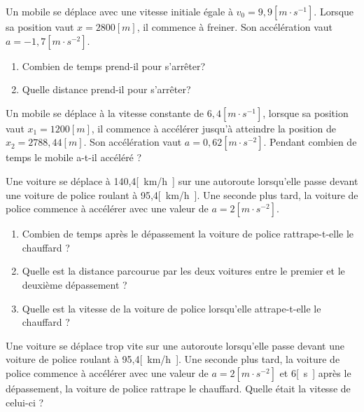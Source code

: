 \begin{exercise}
  Un mobile se déplace avec une vitesse initiale égale à \(v_0=9,9[m \cdot s^{-1}]\). Lorsque sa position vaut \(x=2800[m]\), il commence à freiner. Son accélération vaut \(a=-1,7[m \cdot s^{-2}]\).
  \begin{enumerate}[label=\alph*)]
    \item Combien de temps prend-il pour s'arrêter?
    \item Quelle distance prend-il pour s'arrêter?
  \end{enumerate}
\end{exercise}

\begin{exercise}
  Un mobile se déplace à la vitesse constante de \(6,4[m \cdot s^{-1}]\), lorsque sa position vaut \(x_1=1200[m]\), il commence à accélérer jusqu'à atteindre la position de \(x_2=2788,44[m]\). Son accélération vaut \(a=0,62\unit{[m \cdot s^{-2}]}\).
  Pendant combien de temps le mobile a-t-il accéléré ?
\end{exercise}

\begin{exercise}[difficulty=***]
  Une voiture se déplace à 140,4\unit{[km/h]} sur une autoroute lorsqu'elle passe devant une voiture de police roulant à 95,4\unit{[km/h]}. Une seconde plus tard, la voiture de police commence à accélérer avec une valeur de \(a=2\unit{[m \cdot s^{-2}]}\).
  \begin{enumerate}[label=\alph*)]
    \item Combien de temps après le dépassement la voiture de police rattrape-t-elle le chauffard ?
    \item Quelle est la distance parcourue par les deux voitures entre le premier et le deuxième dépassement ?
    \item Quelle est la vitesse de la voiture de police lorsqu'elle attrape-t-elle le chauffard ?
  \end{enumerate}
\end{exercise}

\begin{exercise}[difficulty=***]
  Une voiture se déplace trop vite sur une autoroute lorsqu'elle passe devant une voiture de police roulant à 95,4\unit{[km/h]}. Une seconde plus tard, la voiture de police commence à accélérer avec une valeur de \(a=2\unit{[m \cdot s^{-2}]}\) et 6\unit{[s]} après le dépassement, la voiture de police rattrape le chauffard.
  Quelle était la vitesse de celui-ci ?
\end{exercise}


